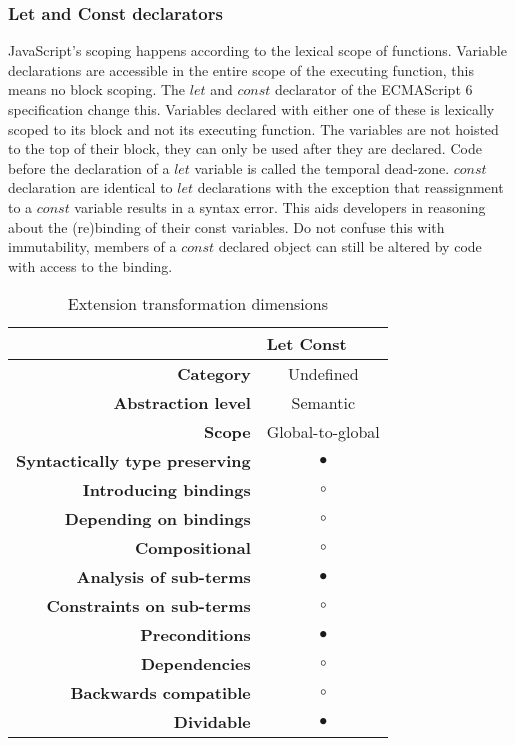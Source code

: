 \subsubsection{Let and Const declarators} \label{let-const}
JavaScript's scoping happens according to the lexical scope of functions. Variable declarations are accessible in the entire scope of the executing function, this means no block scoping. The $let$ and $const$ declarator of the ECMAScript 6 specification change this. Variables declared with either one of these is lexically scoped to its block and not its executing function. The variables are not hoisted to the top of their block, they can only be used after they are declared. Code before the declaration of a $let$ variable is called the temporal dead-zone. $const$ declaration are identical to $let$ declarations with the exception that reassignment to a $const$ variable results in a syntax error. This aids developers in reasoning about the (re)binding of their const variables. Do not confuse this with immutability, members of a $const$ declared object can still be altered by code with access to the binding.

\begin{table}[h]
\centering
\caption{Extension transformation dimensions}
\label{let-const-table}
\begin{tabular}{@{}rc@{}}
\toprule
                                       & \multicolumn{1}{l}{\textbf{Let Const}} \\ \midrule
\textbf{Category}                      & Undefined
\\
\textbf{Abstraction level}             & Semantic                          \\
\textbf{Scope}                         & Global-to-global                               \\
\textbf{Syntactically type preserving} & $\bullet$                                          \\
\textbf{Introducing bindings}          & $\circ$                                          \\%
\textbf{Depending on bindings}         & $\circ$                                           \\
\textbf{Compositional}                 & $\circ$                                          \\
\textbf{Analysis of sub-terms}          & $\bullet$                                          \\
\textbf{Constraints on sub-terms}       & $\circ$                                           \\
\textbf{Preconditions}                 & $\bullet$                                          \\
\textbf{Dependencies}                  & $\circ$                                           \\
\textbf{Backwards compatible}          & $\circ$                                          \\
\textbf{Dividable}                     & $\bullet$                                           \\ \bottomrule
\end{tabular}
\end{table}

